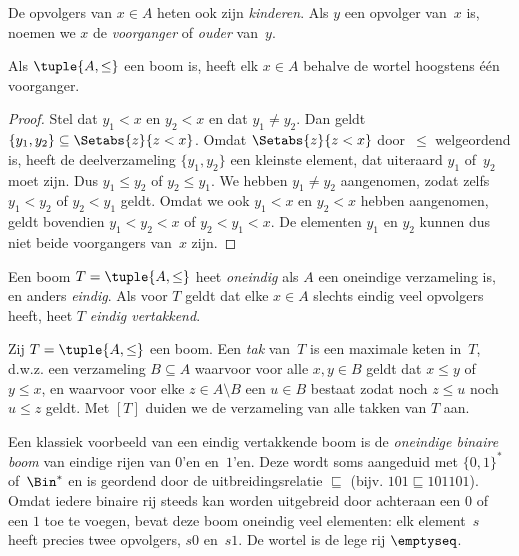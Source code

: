 \documentclass[../../../include/open-logic-section]{subfiles}
\begin{document}
De opvolgers van $x \in A$ heten ook zijn \emph{kinderen}. Als $y$
een opvolger van~$x$ is, noemen we $x$ de \emph{voorganger} of
\emph{ouder} van~$y$.

\begin{prop}
Als $\tuple{A,\le}$ een boom is, heeft elk $x \in A$ behalve de wortel
hoogstens één voorganger.
\end{prop}

\begin{proof}
  Stel dat $y_1 < x$ en $y_2 < x$ en dat $y_1 \neq y_2$. Dan geldt
  $\{y_1, y_2\} \subseteq \Setabs{z}{z<x}$. Omdat
  $\Setabs{z}{z<x}$ door~$\le$ welgeordend is, heeft de deelverzameling
  $\{y_1, y_2\}$ een kleinste element, dat uiteraard $y_1$ of~$y_2$
  moet zijn. Dus $y_1 \le y_2$ of $y_2 \le y_1$. We hebben
  $y_1 \neq y_2$ aangenomen, zodat zelfs $y_1 < y_2$ of $y_2 < y_1$
  geldt. Omdat we ook $y_1 < x$ en $y_2 < x$ hebben aangenomen, geldt
  bovendien $y_1 < y_2 < x$ of $y_2 < y_1 < x$. De elementen $y_1$
  en $y_2$ kunnen dus niet beide voorgangers van~$x$ zijn.
\end{proof}

\begin{defn}
Een boom $T = \tuple{A, \le}$ heet \emph{oneindig} als $A$ een
oneindige verzameling is, en anders \emph{eindig}. Als voor $T$ geldt
dat elke $x \in A$ slechts eindig veel opvolgers heeft, heet $T$ \emph{eindig
vertakkend}.
\end{defn}

\begin{defn}[Takken]
Zij $T = \tuple{A, \le}$ een boom. Een \emph{tak} van~$T$ is een
maximale keten in~$T$, d.w.z. een verzameling $B \subseteq A$ waarvoor
voor alle $x, y \in B$ geldt dat $x \le y$ of $y \le x$, en waarvoor
voor elke $z \in A \setminus B$ een $u \in B$ bestaat zodat noch
$z \le u$ noch $u \le z$ geldt.
%
Met $[T]$ duiden we de verzameling van alle takken van $T$ aan.
\end{defn}

\begin{ex}
Een klassiek voorbeeld van een eindig vertakkende boom is de
\emph{oneindige binaire boom} van eindige rijen van $0$'en en~$1$'en.
Deze wordt soms aangeduid met $\{0,1\}^*$ of~$\Bin^*$ en is geordend
door de uitbreidingsrelatie $\sqsubseteq$ (bijv.
$101 \sqsubseteq 101101$). Omdat iedere binaire rij steeds kan worden
uitgebreid door achteraan een $0$ of een $1$ toe te voegen, bevat deze
boom oneindig veel elementen: elk element~$s$ heeft precies twee
opvolgers, $s0$ en~$s1$. De wortel is de lege rij $\emptyseq$.
\end{ex}
\end{document}
